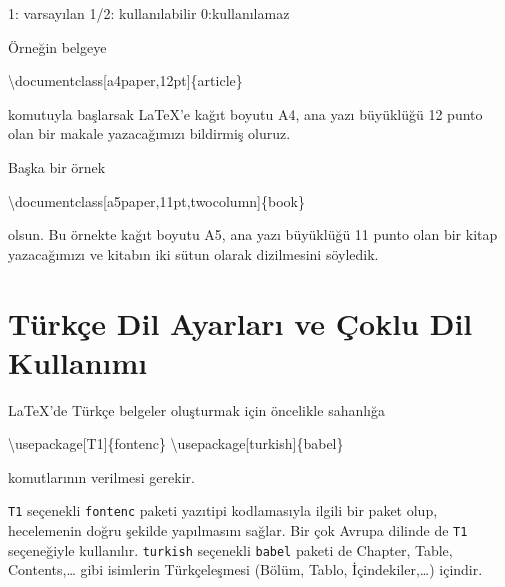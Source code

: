 \documentclass[
  10pt,
]{scrbook}
\newenvironment{Shaded}{\begin{snugshade}}{\end{snugshade}}
\newcommand{\BuiltInTok}[1]{#1}
\newcommand{\ExtensionTok}[1]{#1}
\newcommand{\NormalTok}[1]{#1}
\theoremstyle{definition}
\theoremstyle{definition}
\theoremstyle{definition}
\theoremstyle{definition}
\theoremstyle{remark}
\begin{document}
1: varsayılan 1/2: kullanılabilir 0:kullanılamaz

Örneğin belgeye

\begin{Shaded}
\begin{Highlighting}[]
\BuiltInTok{\textbackslash{}documentclass}\NormalTok{[a4paper,12pt]\{}\ExtensionTok{article}\NormalTok{\}}
\end{Highlighting}
\end{Shaded}

komutuyla başlarsak LaTeX'e kağıt boyutu A4, ana yazı büyüklüğü 12 punto olan bir makale yazacağımızı bildirmiş oluruz.

Başka bir örnek

\begin{Shaded}
\begin{Highlighting}[]
\BuiltInTok{\textbackslash{}documentclass}\NormalTok{[a5paper,11pt,twocolumn]\{}\ExtensionTok{book}\NormalTok{\}}
\end{Highlighting}
\end{Shaded}

olsun. Bu örnekte kağıt boyutu A5, ana yazı büyüklüğü 11 punto olan bir kitap yazacağımızı ve kitabın iki sütun olarak dizilmesini söyledik.

\hypertarget{turkce}{%
\section{Türkçe Dil Ayarları ve Çoklu Dil Kullanımı}\label{turkce}}

LaTeX'de Türkçe belgeler oluşturmak için öncelikle sahanlığa

\begin{Shaded}
\begin{Highlighting}[]
\BuiltInTok{\textbackslash{}usepackage}\NormalTok{[T1]\{}\ExtensionTok{fontenc}\NormalTok{\}}
\BuiltInTok{\textbackslash{}usepackage}\NormalTok{[turkish]\{}\ExtensionTok{babel}\NormalTok{\}}
\end{Highlighting}
\end{Shaded}

komutlarının verilmesi gerekir.

\texttt{T1} seçenekli \texttt{fontenc} paketi yazıtipi kodlamasıyla ilgili bir paket olup, hecelemenin doğru şekilde yapılmasını sağlar. Bir çok Avrupa dilinde de \texttt{T1} seçeneğiyle kullanılır. \texttt{turkish} seçenekli \texttt{babel} paketi de Chapter, Table, Contents,\ldots{} gibi isimlerin Türkçeleşmesi (Bölüm, Tablo, İçindekiler,\ldots) içindir.
\end{document}
